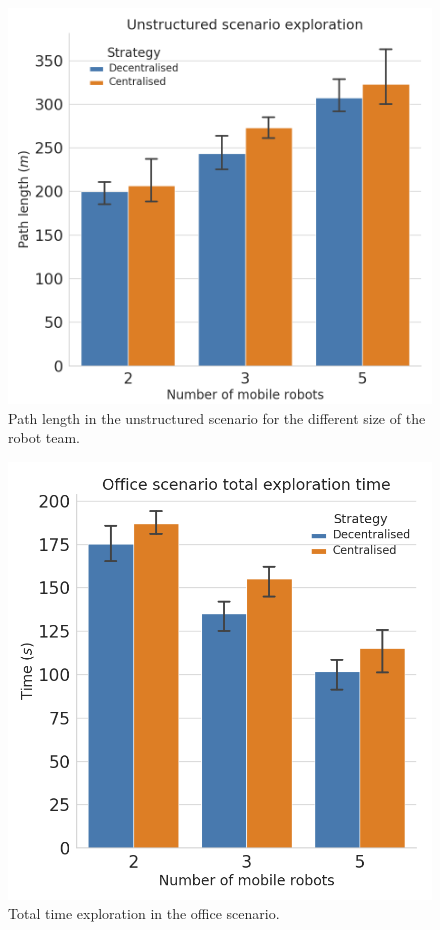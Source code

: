 \documentclass[letterpaper, 10 pt, conference]{ieeeconf}  %
\begin{document}
\begin{figure}[h!]
	\centering\includegraphics[width=0.7\columnwidth]{Unstructured_path.png}
	\caption{Path length in the unstructured scenario for the different size of the robot team.}
	\label{fig:unstruc_path}
\end{figure}

\begin{figure}[h!]
	\centering\includegraphics[width=0.7\columnwidth]{TT_office.png}
	\caption{Total time exploration in the office scenario.}
	\label{fig:office_tt}
\end{figure}
\end{document}
